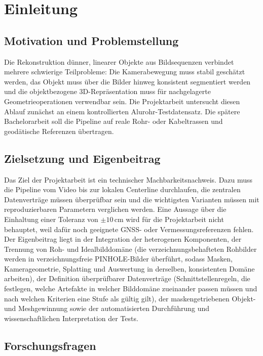 \section{Einleitung}

\subsection{Motivation und Problemstellung}

Die Rekonstruktion dünner, linearer Objekte aus Bildsequenzen verbindet mehrere
schwierige Teilprobleme: Die Kamerabewegung muss stabil geschätzt werden, das
Objekt muss über die Bilder hinweg konsistent segmentiert werden und die
objektbezogene 3D-Repräsentation muss für nachgelagerte Geometrieoperationen
verwendbar sein. Die Projektarbeit untersucht diesen Ablauf zunächst an einem
kontrollierten Alurohr-Testdatensatz. Die spätere Bachelorarbeit soll die
Pipeline auf reale Rohr- oder Kabeltrassen und geodätische Referenzen
übertragen.

\subsection{Zielsetzung und Eigenbeitrag}

Das Ziel der Projektarbeit ist ein technischer Machbarkeitsnachweis. Dazu muss
die Pipeline vom Video bis zur lokalen Centerline durchlaufen, die zentralen
Datenverträge müssen überprüfbar sein und die wichtigsten Varianten müssen mit
reproduzierbaren Parametern verglichen werden. Eine Aussage über die Einhaltung
einer Toleranz von \(\pm 10\,\mathrm{cm}\) wird für die Projektarbeit nicht
behauptet, weil dafür noch geeignete GNSS- oder Vermessungsreferenzen fehlen.
Der Eigenbeitrag liegt in der Integration der heterogenen Komponenten, der
Trennung von Roh- und Idealbilddomäne (die verzeichnungsbehafteten Rohbilder
werden in verzeichnungsfreie PINHOLE-Bilder überführt, sodass Masken,
Kamerageometrie, Splatting und Auswertung in derselben, konsistenten Domäne
arbeiten), der Definition überprüfbarer Datenverträge (Schnittstellenregeln,
die festlegen, welche Artefakte in welcher Bilddomäne zueinander passen
müssen und nach welchen Kriterien eine Stufe als gültig gilt), der
maskengetriebenen Objekt- und Meshgewinnung sowie der automatisierten
Durchführung und wissenschaftlichen Interpretation der Tests.

\subsection{Forschungsfragen}

